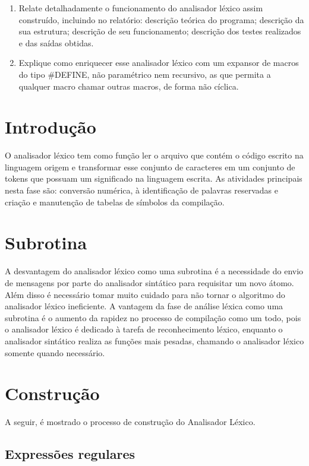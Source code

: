 \begin{enumerate}
\item{Relate detalhadamente o funcionamento do analisador léxico assim construído, incluindo no relatório: descrição teórica do programa; descrição da sua estrutura; descrição de seu funcionamento; descrição dos testes realizados e das saídas obtidas.}

\item{Explique como enriquecer esse analisador léxico com um expansor de macros do tipo \#DEFINE, não paramétrico nem recursivo, as que permita a qualquer macro chamar outras macros, de forma não cíclica.}

\end{enumerate}

\section{Introdução}
O analisador léxico tem como função ler o arquivo que contém o código escrito na linguagem origem e transformar esse conjunto de caracteres em um conjunto de tokens que possuam um significado na linguagem escrita. As atividades principais nesta fase são: conversão numérica, à identificação de palavras reservadas e criação e manutenção de tabelas de símbolos da compilação.

\section{Subrotina}
A desvantagem do analisador léxico como uma subrotina é a necessidade do envio de mensagens por parte do analisador sintático para requisitar um novo átomo. Além disso é necessário tomar muito cuidado para não tornar o algoritmo do analisador léxico ineficiente. A vantagem da fase de análise léxica como uma subrotina é o aumento da rapidez no processo de compilação como um todo, pois o analisador léxico é dedicado à tarefa de reconhecimento léxico, enquanto o analisador sintático realiza as funções mais pesadas, chamando o analisador léxico somente quando necessário.

\section{Construção}

A seguir, é mostrado o processo de construção do Analisador Léxico.

\subsection{Expressões regulares}

